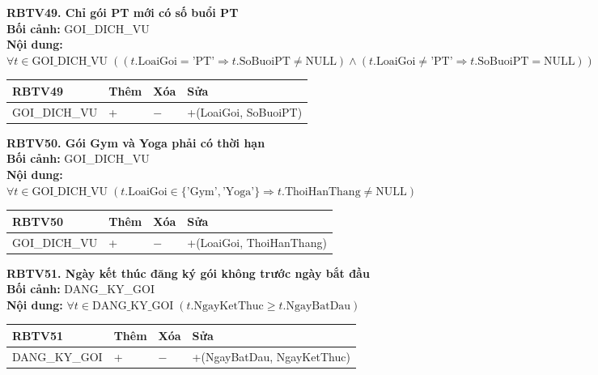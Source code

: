 \documentclass[11pt, a4paper]{article}
\begin{document}
\vspace{0.8em}
\textbf{RBTV49. Chỉ gói PT mới có số buổi PT} \\
\textbf{Bối cảnh:} GOI\_DICH\_VU \\
\textbf{Nội dung:} $\forall t \in \text{GOI\_DICH\_VU} \; ((t.\text{LoaiGoi} = \text{'PT'} \Rightarrow t.\text{SoBuoiPT} \neq \text{NULL}) \land (t.\text{LoaiGoi} \neq \text{'PT'} \Rightarrow t.\text{SoBuoiPT} = \text{NULL}))$

\vspace{0.3em}
\begin{small}
\begin{tabularx}{\textwidth}{| C{4.2cm} | C{2cm} | C{2cm} | Y |}
\hline
\textbf{RBTV49} & \textbf{Thêm} & \textbf{Xóa} & \textbf{Sửa} \\
\hline
GOI\_DICH\_VU & + & $-$ & +(LoaiGoi, SoBuoiPT) \\
\hline
\end{tabularx}
\end{small}

\vspace{0.8em}
\textbf{RBTV50. Gói Gym và Yoga phải có thời hạn} \\
\textbf{Bối cảnh:} GOI\_DICH\_VU \\
\textbf{Nội dung:} $\forall t \in \text{GOI\_DICH\_VU} \; (t.\text{LoaiGoi} \in \{\text{'Gym'}, \text{'Yoga'}\} \Rightarrow t.\text{ThoiHanThang} \neq \text{NULL})$

\vspace{0.3em}
\begin{small}
\begin{tabularx}{\textwidth}{| C{4.2cm} | C{2cm} | C{2cm} | Y |}
\hline
\textbf{RBTV50} & \textbf{Thêm} & \textbf{Xóa} & \textbf{Sửa} \\
\hline
GOI\_DICH\_VU & + & $-$ & +(LoaiGoi, ThoiHanThang) \\
\hline
\end{tabularx}
\end{small}

\vspace{0.8em}
\textbf{RBTV51. Ngày kết thúc đăng ký gói không trước ngày bắt đầu} \\
\textbf{Bối cảnh:} DANG\_KY\_GOI \\
\textbf{Nội dung:} $\forall t \in \text{DANG\_KY\_GOI} \; (t.\text{NgayKetThuc} \ge t.\text{NgayBatDau})$

\vspace{0.3em}
\begin{small}
\begin{tabularx}{\textwidth}{| C{4.2cm} | C{2cm} | C{2cm} | Y |}
\hline
\textbf{RBTV51} & \textbf{Thêm} & \textbf{Xóa} & \textbf{Sửa} \\
\hline
DANG\_KY\_GOI & + & $-$ & +(NgayBatDau, NgayKetThuc) \\
\hline
\end{tabularx}
\end{small}
\end{document}
